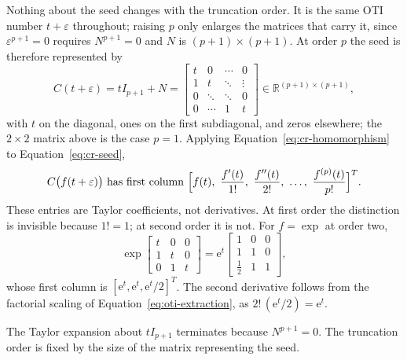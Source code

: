 \documentclass[10pt]{article}
\begin{document}
Nothing about the seed changes with the truncation order. It is the same OTI
number $t+\varepsilon$ throughout; raising $p$ only enlarges the matrices that
carry it, since $\varepsilon^{p+1}=0$ requires $N^{p+1}=0$ and $N$ is
$(p+1)\times(p+1)$. At order $p$ the seed is therefore represented by
\begin{equation}
\label{eq:cr-seed}
 C(t+\varepsilon)=tI_{p+1}+N=
 \begin{bmatrix}
  t      & 0      & \cdots & 0      \\
  1      & t      & \ddots & \vdots \\
  0      & \ddots & \ddots & 0      \\
  0      & \cdots & 1      & t
 \end{bmatrix}
 \in\mathbb R^{(p+1)\times(p+1)},
\end{equation}
with $t$ on the diagonal, ones on the first subdiagonal, and zeros elsewhere;
the $2\times2$ matrix above is the case $p=1$. Applying
Equation~\eqref{eq:cr-homomorphism} to Equation~\eqref{eq:cr-seed},
\begin{equation}
\label{eq:cr-column}
 C\bigl(f(t+\varepsilon)\bigr)\ \text{has first column}\
 \Bigl[f(t),\ \frac{f'(t)}{1!},\ \frac{f''(t)}{2!},\ \dots,\
       \frac{f^{(p)}(t)}{p!}\Bigr]^{T}.
\end{equation}
These entries are Taylor coefficients, not derivatives. At first order the
distinction is invisible because $1!=1$; at second order it is not. For
$f=\exp$ at order two,
\[
 \exp\!\begin{bmatrix}t&0&0\\1&t&0\\0&1&t\end{bmatrix}
 =\mathrm e^{t}\begin{bmatrix}1&0&0\\1&1&0\\ \tfrac12&1&1\end{bmatrix},
\]
whose first column is $[\mathrm e^{t},\mathrm e^{t},\mathrm e^{t}/2]^{T}$. The
second derivative follows from the factorial scaling of
Equation~\eqref{eq:oti-extraction}, as $2!\,(\mathrm e^{t}/2)=\mathrm e^{t}$.

The Taylor expansion about $tI_{p+1}$ terminates because $N^{p+1}=0$.
The truncation order is fixed by the size of the matrix representing the seed.
\end{document}
